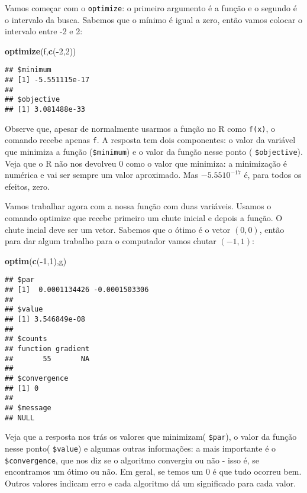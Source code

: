 \documentclass[]{book}
\newenvironment{Shaded}{\begin{snugshade}}{\end{snugshade}}
\newcommand{\KeywordTok}[1]{\textcolor[rgb]{0.13,0.29,0.53}{\textbf{#1}}}
\newcommand{\DecValTok}[1]{\textcolor[rgb]{0.00,0.00,0.81}{#1}}
\newcommand{\OperatorTok}[1]{\textcolor[rgb]{0.81,0.36,0.00}{\textbf{#1}}}
\newcommand{\NormalTok}[1]{#1}
\begin{document}
Vamos começar com o \texttt{optimize}: o primeiro argumento é a função e
o segundo é o intervalo da busca. Sabemos que o mínimo é igual a zero,
então vamos colocar o intervalo entre -2 e 2:

\begin{Shaded}
\begin{Highlighting}[]
\KeywordTok{optimize}\NormalTok{(f,}\KeywordTok{c}\NormalTok{(}\OperatorTok{-}\DecValTok{2}\NormalTok{,}\DecValTok{2}\NormalTok{))}
\end{Highlighting}
\end{Shaded}

\begin{verbatim}
## $minimum
## [1] -5.551115e-17
## 
## $objective
## [1] 3.081488e-33
\end{verbatim}

Observe que, apesar de normalmente usarmos a função no R como
\texttt{f(x)}, o comando recebe apenas \texttt{f}. A resposta tem dois
componentes: o valor da variável que minimiza a função
(\texttt{\$minimum}) e o valor da função nesse ponto (
\texttt{\$objective}). Veja que o R não nos devolveu 0 como o valor que
minimiza: a minimização é numérica e vai ser sempre um valor aproximado.
Mas \(-5.55 10^{-17}\) é, para todos os efeitos, zero.

Vamos trabalhar agora com a nossa função com duas variáveis. Usamos o
comando optimize que recebe primeiro um chute inicial e depois a função.
O chute incial deve ser um vetor. Sabemos que o ótimo é o vetor
\((0,0)\), então para dar algum trabalho para o computador vamos chutar
\((-1,1)\):

\begin{Shaded}
\begin{Highlighting}[]
\KeywordTok{optim}\NormalTok{(}\KeywordTok{c}\NormalTok{(}\OperatorTok{-}\DecValTok{1}\NormalTok{,}\DecValTok{1}\NormalTok{),g)}
\end{Highlighting}
\end{Shaded}

\begin{verbatim}
## $par
## [1]  0.0001134426 -0.0001503306
## 
## $value
## [1] 3.546849e-08
## 
## $counts
## function gradient 
##       55       NA 
## 
## $convergence
## [1] 0
## 
## $message
## NULL
\end{verbatim}

Veja que a resposta nos trás os valores que minimizam( \texttt{\$par}),
o valor da função nesse ponto( \texttt{\$value}) e algumas outras
informações: a mais importante é o \texttt{\$convergence}, que nos diz
se o algoritmo convergiu ou não - isso é, se encontramos um ótimo ou
não. Em geral, se temos um 0 é que tudo ocorreu bem. Outros valores
indicam erro e cada algoritmo dá um significado para cada valor.
\end{document}
